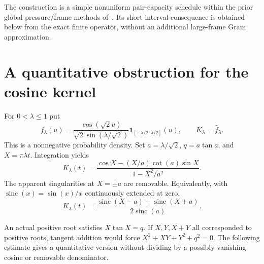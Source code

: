﻿\documentclass[11pt]{article}
\theoremstyle{remark}
\begin{document}
The construction is a simple nonuniform pair-capacity schedule within
the prior global pressure/frame methods of~\cite{Ainta,Trmdy,Tawan,Shi}.
Its short-interval consequence is obtained below from the exact finite
operator, without an additional large-frame Gram approximation.

\section{A quantitative obstruction for the cosine kernel}

For $0<\lambda\le1$ put
\begin{equation}\label{eq:density}
 f_\lambda(u)=\frac{\cos(\sqrt2u)}{\sqrt2\sin(\lambda/\sqrt2)}
       \mathbf1_{[-\lambda/2,\lambda/2]}(u),\qquad
 K_\lambda=\widehat f_\lambda.
\end{equation}
This is a nonnegative probability density. Set $a=\lambda/\sqrt2$,
$q=a\tan a$, and $X=\pi\lambda t$. Integration yields
\begin{equation}\label{eq:kernel}
 K_\lambda(t)=
 \frac{\cos X-(X/a)\cot(a)\sin X}{1-X^2/a^2}.
\end{equation}
The apparent singularities at $X=\pm a$ are removable. Equivalently,
with $\operatorname{sinc}(x)=\sin(x)/x$ continuously extended at zero,
\begin{equation}\label{eq:sinc}
 K_\lambda(t)=
 \frac{\operatorname{sinc}(X-a)+\operatorname{sinc}(X+a)}
      {2\operatorname{sinc}(a)}.
\end{equation}

An actual positive root satisfies $X\tan X=q$. If $X,Y,X+Y$ all
corresponded to positive roots, tangent addition would force
$X^2+XY+Y^2+q^2=0$. The following estimate gives a quantitative version
without dividing by a possibly vanishing cosine or removable denominator.
\end{document}

